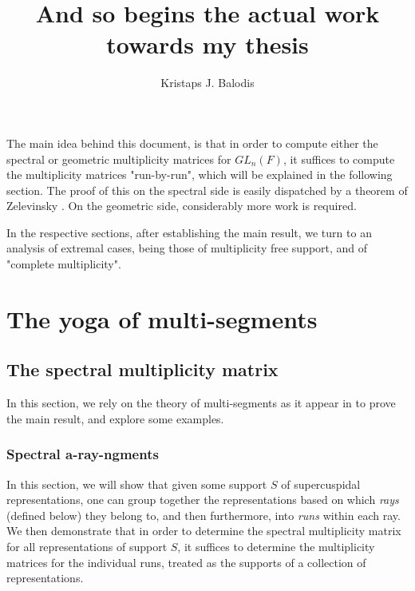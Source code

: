 \documentclass{memoir}
\title{And so begins the actual work towards my thesis}
\author{Kristaps J. Balodis}
\theoremstyle{definition}
\begin{document}
		
		\maketitle
		
	\tableofcontents 
	
	The main idea behind this document, is that in order to compute either the spectral or geometric multiplicity matrices for $GL_n(F)$, it suffices to compute the multiplicity matrices "run-by-run", which will be explained in the following section.  
	The proof of this on the spectral side is easily dispatched by a theorem of Zelevinsky \cite{ZelI2}.  
	On the geometric side, considerably more work is required.  
	
	In the respective sections, after establishing the main result, we turn to an analysis of extremal cases, being those of multiplicity free support, and of "complete multiplicity".  
	
	
	
	
	
	
	
	
	
	
	
	
	
	
	
	
	
	
	
	
	
	
	
	
	\chapter{The yoga of multi-segments}
	
	\section{The spectral multiplicity matrix}
	
	In this section, we rely on the theory of multi-segments as it appear in \cite{ZelI2} to prove the main result, and explore some examples.  
	
	 	\subsection{Spectral a-ray-ngments}
	 	
	 In this section, we will show that given some support $S$ of supercuspidal representations, one can group together the representations based on which \emph{rays} (defined below) they belong to, and then furthermore, into \emph{runs} within each ray.  
	 We then demonstrate that in order to determine the spectral multiplicity matrix for all representations of support $S$, it suffices to determine the multiplicity matrices for the individual runs, treated as the supports of a collection of representations.  
	 
\end{document}
